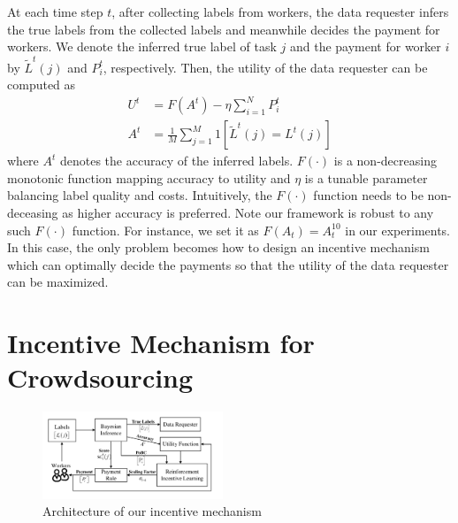 \documentclass{article}
\begin{document}
At each time step $t$, after collecting labels from workers, the data requester infers the true labels from the collected labels and meanwhile decides the payment for workers.
We denote the inferred true label of task $j$ and the payment for worker $i$ by $\tilde{L}^{t}(j)$ and $P^{t}_{i}$, respectively.
Then, the utility of the data requester can be computed as
\begin{equation}
\begin{split}
U^t &= F(A^t) - \eta {\sum}_{i=1}^{N}P^t_i \\
A^t&=\frac{1}{M}{\sum}_{j=1}^{M}1\left[\tilde{L}^{t}(j)=L^{t}(j)\right]
\end{split}
\end{equation}
where $A^t$ denotes the accuracy of the inferred labels. $F(\cdot)$ is a non-decreasing monotonic function mapping accuracy to utility and $\eta$ is a
tunable parameter balancing label quality and costs. Intuitively, the $F(\cdot)$ function needs to be non-deceasing as higher accuracy is preferred. Note our framework is robust to any such $F(\cdot)$ function. For instance, we set it as $F(A_t)=A^{10}_t$ in our experiments.
{\color{red} In this case, the only problem becomes how to design an incentive mechanism which can optimally decide the payments so that the utility of the data requester can be maximized.}


\section{Incentive Mechanism for Crowdsourcing}

\begin{figure}[!htb]
 	\centering
	\includegraphics[width=0.48\textwidth]{image/Architecture}
	\vspace*{-8mm}
    \caption{\label{Archi} Architecture of our incentive mechanism}
\end{figure}
\end{document}
